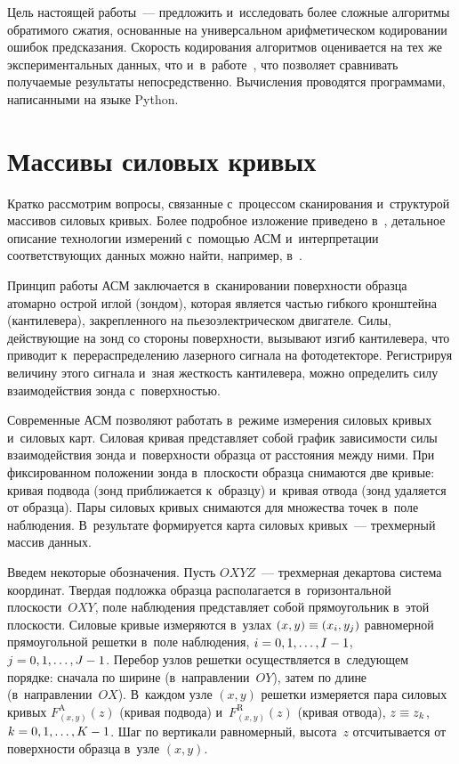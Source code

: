 \begin{multicols}{2}
Цель настоящей работы~--- предложить и~исследовать более сложные алгоритмы обратимого сжатия, 
основанные на универсальном арифметическом кодировании ошибок предсказания. 
Скорость кодирования алгоритмов оценивается на тех же экспериментальных данных, что и~в~работе~\cite{b1}, 
что позволяет сравнивать получаемые результаты непосредственно. Вычисления проводятся 
программами, написанными на языке Python.
{

}

\section{Массивы силовых кривых}

Кратко рассмотрим вопросы, связанные с~процессом сканирования и~структурой массивов 
силовых кривых. Более подробное изложение приведено в~\cite{b1}, детальное описание 
технологии \mbox{измерений} с~по\-мощью АСМ и~интерпретации со\-от\-вет\-ст\-ву\-ющих данных можно найти, 
например, в~\cite{b2}.

Принцип работы АСМ заключается в~сканировании поверхности образца атомарно острой иглой 
(зондом), которая является частью гибкого кронштейна (кантилевера), закрепленного на 
пьезоэлектрическом двигателе. Силы, действующие на зонд со стороны поверхности, 
вызывают изгиб кантилевера, что приводит к~перераспределению лазерного сигнала на 
фотодетекторе. Регистрируя величину этого сигнала и~зная жесткость кантилевера, 
можно определить силу взаимодействия зонда с~поверхностью.

Современные АСМ позволяют работать в~режиме измерения силовых кривых и~силовых карт. 
Силовая кривая представляет собой график зависимости силы взаимодействия зонда и~поверхности 
образца от расстояния между ними. При фиксированном положении зонда в~плоскости образца 
снимаются две кривые: кривая подвода (зонд приближается к~образцу) и~кривая отвода 
(зонд удаляется от образца). Пары силовых кривых снимаются для множества точек в~поле наблюдения. 
В~результате формируется карта силовых кривых~--- трехмерный массив данных.

Введем некоторые обозначения. Пусть $OXYZ$~--- трехмерная декартова система координат. 
Твердая подложка образца располагается в~горизонтальной плоскости~$OXY$, 
поле наблюдения представляет собой прямоугольник в~этой плоскости. Силовые кривые измеряются 
в~узлах $(x,y)\hm\equiv (x_i,y_j)$ равномерной прямоугольной решетки в~поле наблюдения, 
$i\hm=0,1,\ldots,I-1$, $j\hm=0,1,\ldots,J-1$. Перебор узлов решетки осуществляется 
в~следующем порядке: сначала по ширине (в~на\-прав\-ле\-нии~$OY$), затем по длине (в~на\-прав\-ле\-нии~$OX$). 
В~каждом узле $(x,y)$ решетки измеряется пара силовых кривых 
$F^\text{A}_{(x,y)}(z)$ (кривая подвода) и~$F^\text{R}_{(x,y)}(z)$ 
(кривая отвода), $z\hm\equiv z_k$, $k\hm=0,1,\ldots,K-1$. 
Шаг по вертикали равномерный, высота~$z$ отсчитывается от поверхности образца в~узле $(x,y)$.


\end{multicols}
